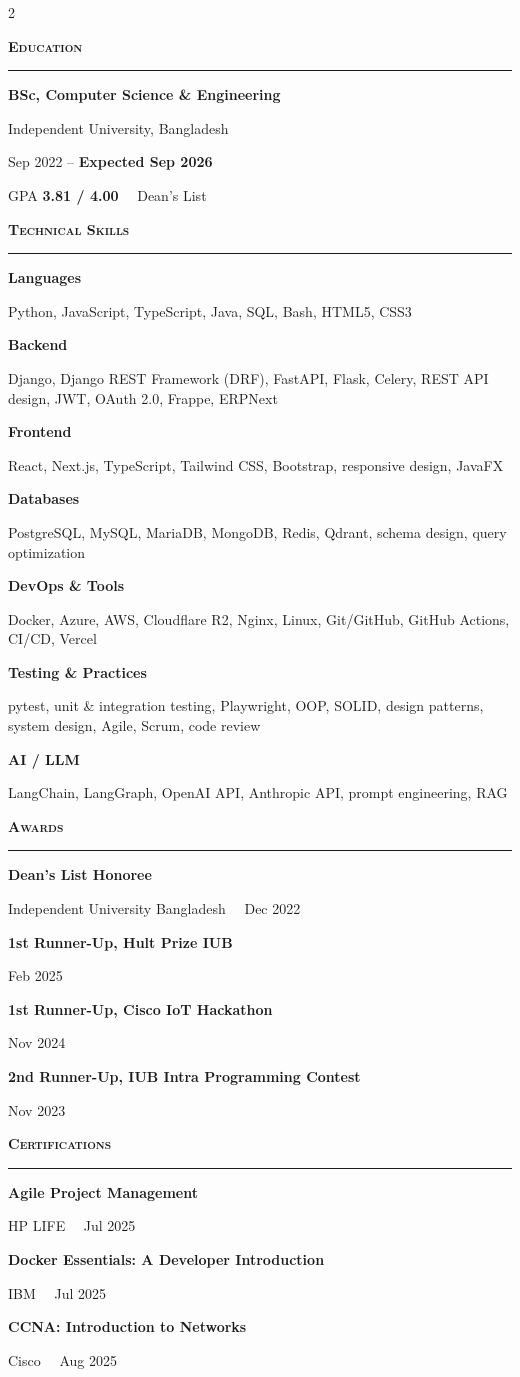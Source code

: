 \documentclass[a4paper,10pt]{article}
\newcommand{\dotsep}{\ \textperiodcentered\ }
\newcommand{\cvsection}[1]{%
  \vspace{7pt}%
  {\color{accent}\bfseries\scshape\large #1}\par
  \vspace{1pt}%
  \noindent\textcolor{hairline}{\rule{\linewidth}{0.7pt}}\par
  \vspace{4pt}}
\newcommand{\skillgroup}[2]{%
  {\bfseries\small #1}\par{\small #2}\par\vspace{4pt}}
\newcommand{\award}[2]{%
  {\small\bfseries #1}\par{\footnotesize\color{soft} #2}\par\vspace{3.5pt}}
\begin{document}
\begin{paracol}{2}
\switchcolumn

\cvsection{Education}
{\bfseries BSc, Computer Science \& Engineering}\par
{\small\color{accent} Independent University, Bangladesh}\par
{\small Sep 2022 -- \textbf{Expected Sep 2026}}\par
{\small GPA \textbf{3.81 / 4.00} \dotsep Dean's List}

\cvsection{Technical Skills}
\skillgroup{Languages}{Python, JavaScript, TypeScript, Java, SQL, Bash, HTML5, CSS3}
\skillgroup{Backend}{Django, Django REST Framework (DRF), FastAPI, Flask, Celery, REST API design, JWT, OAuth 2.0, Frappe, ERPNext}
\skillgroup{Frontend}{React, Next.js, TypeScript, Tailwind CSS, Bootstrap, responsive design, JavaFX}
\skillgroup{Databases}{PostgreSQL, MySQL, MariaDB, MongoDB, Redis, Qdrant, schema design, query optimization}
\skillgroup{DevOps \& Tools}{Docker, Azure, AWS, Cloudflare R2, Nginx, Linux, Git/GitHub, GitHub Actions, CI/CD, Vercel}
\skillgroup{Testing \& Practices}{pytest, unit \& integration testing, Playwright, OOP, SOLID, design patterns, system design, Agile, Scrum, code review}
\skillgroup{AI / LLM}{LangChain, LangGraph, OpenAI API, Anthropic API, prompt engineering, RAG}

\cvsection{Awards}
\award{Dean's List Honoree}{Independent University Bangladesh \dotsep Dec 2022}
\award{1st Runner-Up, Hult Prize IUB}{Feb 2025}
\award{1st Runner-Up, Cisco IoT Hackathon}{Nov 2024}
\award{2nd Runner-Up, IUB Intra Programming Contest}{Nov 2023}

\cvsection{Certifications}
\award{Agile Project Management}{HP LIFE \dotsep Jul 2025}
\award{Docker Essentials: A Developer Introduction}{IBM \dotsep Jul 2025}
\award{CCNA: Introduction to Networks}{Cisco \dotsep Aug 2025}

\end{paracol}
\end{document}

